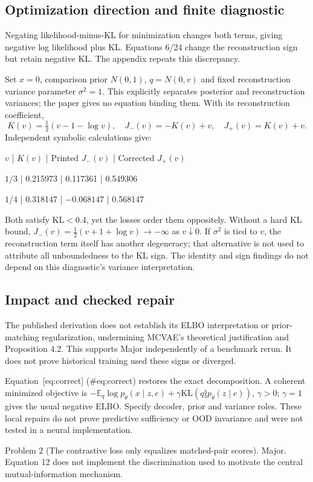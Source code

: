 \documentclass[10pt]{article}
\begin{document}
\subsection*{Optimization direction and finite diagnostic}
Negating likelihood-minus-KL for minimization changes both terms, giving negative log likelihood plus KL. Equations 6/24 change the reconstruction sign but retain negative KL. The appendix repeats this discrepancy.\par
Set \(x=0\), comparison prior \(N(0,1)\), \(q=N(0,v)\) and fixed reconstruction variance parameter \(\sigma^2=1\). This explicitly separates posterior and reconstruction variances; the paper gives no equation binding them. With its reconstruction coefficient, \[K(v)=\tfrac12(v-1-\log v),\quad
 J_-(v)=-K(v)+v,\quad J_+(v)=K(v)+v.\] Independent symbolic calculations give:\par
\(v\) | \(K(v)\) | Printed \(J_-(v)\) | Corrected \(J_+(v)\)\par
\(1/3\) | 0.215973 | 0.117361 | 0.549306\par
\(1/4\) | 0.318147 | \(-0.068147\) | 0.568147\par
Both satisfy \(\mathrm{KL}<0.4\), yet the losses order them oppositely. Without a hard KL bound, \(J_-(v)=\frac12(v+1+\log v)\to-\infty\) as \(v\downarrow0\). If \(\sigma^2\) is tied to \(v\), the reconstruction term itself has another degeneracy; that alternative is not used to attribute all unboundedness to the KL sign. The identity and sign findings do not depend on this diagnostic’s variance interpretation.\par
\subsection*{Impact and checked repair}
The published derivation does not establish its ELBO interpretation or prior-matching regularization, undermining MCVAE’s theoretical justification and Proposition 4.2. This supports Major independently of a benchmark rerun. It does not prove historical training used these signs or diverged.\par
Equation [eq:correct] (\#eq:correct) restores the exact decomposition. A coherent minimized objective is \(-\mathbb E_q\log p_\theta(x\mid z,e)+\gamma\mathrm{KL}(q\Vert p_\theta(z\mid e))\), \(\gamma>0\); \(\gamma=1\) gives the usual negative ELBO. Specify decoder, prior and variance roles. These local repairs do not prove predictive sufficiency or OOD invariance and were not tested in a neural implementation.\par
Problem 2 (The contrastive loss only equalizes matched-pair scores).  Major. Equation 12 does not implement the discrimination used to motivate the central mutual-information mechanism.\par
\end{document}
